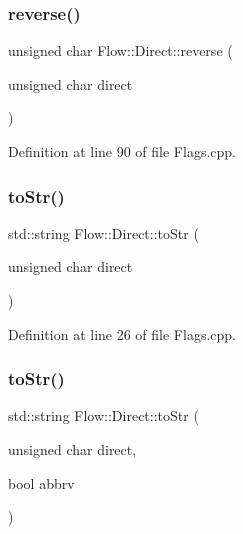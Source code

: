 \subsubsection{\texorpdfstring{reverse()}{reverse()}}
{\footnotesize\ttfamily unsigned char Flow\+::\+Direct\+::reverse (\begin{DoxyParamCaption}\item[{unsigned char}]{direct }\end{DoxyParamCaption})}



Definition at line 90 of file Flags.\+cpp.

\hypertarget{namespace_flow_1_1_direct_aab9d0fe77dd3d02485b768e5c7ccff9d}{}\label{namespace_flow_1_1_direct_aab9d0fe77dd3d02485b768e5c7ccff9d} 
\subsubsection{\texorpdfstring{to\+Str()}{toStr()}\hspace{0.1cm}{\footnotesize\ttfamily [1/2]}}
{\footnotesize\ttfamily std\+::string Flow\+::\+Direct\+::to\+Str (\begin{DoxyParamCaption}\item[{unsigned char}]{direct }\end{DoxyParamCaption})}



Definition at line 26 of file Flags.\+cpp.

\hypertarget{namespace_flow_1_1_direct_a878a0d3e7b3e67a1ed1b5b15bcdac044}{}\label{namespace_flow_1_1_direct_a878a0d3e7b3e67a1ed1b5b15bcdac044} 
\subsubsection{\texorpdfstring{to\+Str()}{toStr()}\hspace{0.1cm}{\footnotesize\ttfamily [2/2]}}
{\footnotesize\ttfamily std\+::string Flow\+::\+Direct\+::to\+Str (\begin{DoxyParamCaption}\item[{unsigned char}]{direct,  }\item[{bool}]{abbrv }\end{DoxyParamCaption})}



